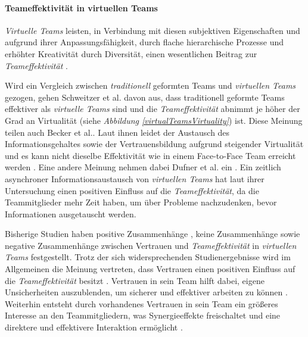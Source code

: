 \documentclass[a4paper,11pt]{article}%
\renewcommand{\\}{\vspace*{0.5\baselineskip} \newline}
\begin{document}
\paragraph{Teameffektivität in virtuellen Teams}
\label{TEinVT}
\textit{Virtuelle Teams} leisten, in Verbindung mit diesen subjektiven Eigenschaften und aufgrund ihrer Anpassungsfähigkeit, durch flache hierarchische Prozesse und erhöhter Kreativität durch Diversität, einen wesentlichen Beitrag zur \textit{Teameffektivität} \citep{handke2019alles} \citep{becker2002fuhrung}.

Wird ein Vergleich zwischen \textit{traditionell} geformten Teams und \textit{virtuellen Teams} gezogen, gehen Schweitzer et al. \citep{schweitzer2010conceptualizing} davon aus, dass traditionell geformte Teams effektiver als \textit{virtuelle Teams} sind und die \textit{Teameffektivität} abnimmt je höher der Grad an Virtualität (siehe \textit{Abbildung \ref{virtualTeamsVirtuality}}) ist.
Diese Meinung teilen auch Becker et al.. Laut ihnen leidet der Austausch des Informationsgehaltes sowie der Vertrauensbildung aufgrund steigender Virtualität und es kann nicht dieselbe Effektivität wie in einem Face-to-Face Team erreicht werden \citep{becker2002fuhrung}.
Eine andere Meinung nehmen dabei Dufner et al. ein \citep{dufner2002asynchronous}. Ein zeitlich asynchroner Informationsaustausch von \textit{virtuellen Teams} hat laut ihrer Untersuchung einen positiven Einfluss auf die \textit{Teameffektivität}, da die Teammitglieder mehr Zeit haben, um über Probleme nachzudenken, bevor Informationen ausgetauscht werden.

Bisherige Studien haben positive Zusammenhänge \citep{davis2000trusted}, keine Zusammenhänge \citep{hertel2004managing} sowie negative Zusammenhänge \citep{dirks1999effects} zwischen Vertrauen und \textit{Teameffektivität} in \textit{virtuellen Teams} festgestellt.
Trotz der sich widersprechenden Studienergebnisse wird im Allgemeinen die Meinung vertreten, dass Vertrauen einen positiven Einfluss auf die \textit{Teameffektivität} besitzt \citep{de2016trust}. 
Vertrauen in sein Team hilft dabei, eigene Unsicherheiten auszublenden, um sicherer und effektiver arbeiten zu können \citep{de2010does}. Weiterhin entsteht durch vorhandenes Vertrauen in sein Team ein größeres Interesse an den Teammitgliedern, was Synergieeffekte freischaltet und eine direktere und effektivere Interaktion ermöglicht \citep{dirks1999effects}. 
	
\end{document}
